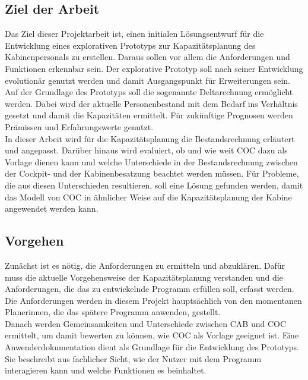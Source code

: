 \documentclass [12pt, a4paper, oneside, titlepage, ngerman]{article}
\begin{document}
\subsection {Ziel der Arbeit} 
Das Ziel dieser Projektarbeit ist, einen initialen Lösungsentwurf für die Entwicklung eines explorativen Prototyps zur Kapazitätsplanung des Kabinenpersonals zu erstellen. Daraus sollen vor allem die Anforderungen und Funktionen erkennbar sein. Der explorative Prototyp soll nach seiner Entwicklung evolutionär genutzt werden und damit Ausgangspunkt für Erweiterungen sein. \\
Auf der Grundlage des Prototyps soll die sogenannte Deltarechnung ermöglicht werden. Dabei wird der aktuelle Personenbestand mit dem Bedarf ins Verhältnis gesetzt und damit die Kapazitäten ermittelt. Für zukünftige Prognosen werden Prämissen und Erfahrungswerte genutzt. \\

\noindent In dieser Arbeit wird für die Kapazitätsplanung die Bestandsrechnung erläutert und angepasst. Darüber hinaus wird evaluiert, ob und wie weit \ac{COC} dazu als Vorlage dienen kann und welche Unterschiede in der Bestandsrechnung zwischen der Cockpit- und der Kabinenbesatzung beachtet werden müssen. Für Probleme, die aus diesen Unterschieden resultieren, soll eine Lösung gefunden werden, damit das Modell von \ac{COC} in ähnlicher Weise auf die Kapazitätsplanung der Kabine angewendet werden kann.

\subsection {Vorgehen}
Zunächst ist es nötig, die Anforderungen zu ermitteln und abzuklären. Dafür muss die aktuelle Vorgehensweise der Kapazitätsplanung verstanden und die Anforderungen, die das zu entwickelnde Programm erfüllen soll, erfasst werden. Die Anforderungen werden in diesem Projekt hauptsächlich von den momentanen Planerinnen, die das spätere Programm anwenden, gestellt. \\
Danach werden Gemeinsamkeiten und Unterschiede zwischen \ac{CAB} und \ac{COC} ermittelt, um damit bewerten zu können, wie \ac{COC} als Vorlage geeignet ist. %
Eine Anwenderdokumentation dient als Grundlage für die Entwicklung des Prototyps. Sie beschreibt aus fachlicher Sicht, wie der Nutzer mit dem Programm interagieren kann und welche Funktionen es beinhaltet.
\end{document}
